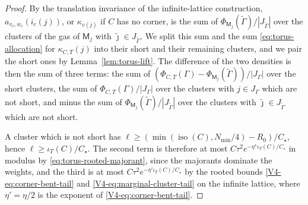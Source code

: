 \documentclass[11pt]{article}
\newcommand{\iso}{\operatorname{iso}}
\numberwithin{equation}{section}
\theoremstyle{remark}
\theoremstyle{plain}
\begin{document}
\begin{proof}
By the translation invariance of the infinite-lattice construction, $a_{v_c,w_c}(i_c(j))$, or $\kappa_{v(j)}$ if $C$ has no corner, is the sum of $\Phi_{\mathsf M_j}(\widetilde\Gamma)/| J_{\widetilde\Gamma}|$ over the clusters of the gas of $\mathsf M_j$ with $\tilde\jmath\in J_{\widetilde\Gamma}$. We split this sum and the sum \eqref{eq:torus-allocation} for $\kappa_{C,T}(j)$ into their short and their remaining clusters, and we pair the short ones by Lemma~\ref{lem:torus-lift}. The difference of the two densities is then the sum of three terms: the sum of $(\Phi_{C,T}(\Gamma)-\Phi_{\mathsf M_j}(\widetilde\Gamma))/| J_{\Gamma}|$ over the short clusters, the sum of $\Phi_{C,T}(\Gamma)/| J_{\Gamma}|$ over the clusters with $j\in J_{\Gamma}$ which are not short, and minus the sum of $\Phi_{\mathsf M_j}(\widetilde\Gamma)/| J_{\widetilde\Gamma}|$ over the clusters with $\tilde\jmath\in J_{\widetilde\Gamma}$ which are not short.

A cluster which is not short has $\ell\geqslant (\min(\iso(C),N_{\min}/4)-R_0)/C_{\star}$, hence $\ell\geqslant \iota_T(C)/C_{\star}$. The second term is therefore at most $C\tau^2e^{-\eta^{\star}\iota_T(C)/C_{\star}}$ in modulus by \eqref{eq:torus-rooted-majorant}, since the majorants dominate the weights, and the third is at most $C\tau^2e^{-\eta'\iota_T(C)/C_{\star}}$ by the rooted bounds \eqref{V4-eq:corner-bent-tail} and \eqref{V4-eq:marginal-cluster-tail} on the infinite lattice, where $\eta'=\eta/2$ is the exponent of \eqref{V4-eq:corner-bent-tail}.


\end{proof}
\end{document}
